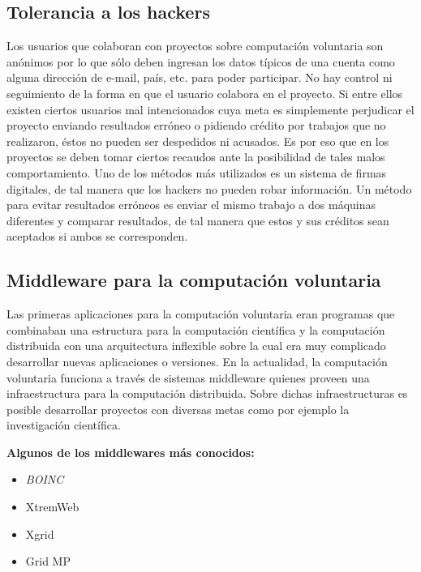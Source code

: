 \subsection{Tolerancia a los hackers}

Los usuarios que colaboran con proyectos sobre computación voluntaria son anónimos por lo que sólo deben ingresan los datos típicos de una cuenta 
como alguna dirección de e-mail, país, etc. para poder participar. No hay control ni seguimiento de la forma en que el usuario colabora en el proyecto. 
Si entre ellos existen ciertos usuarios mal intencionados cuya meta es simplemente perjudicar el proyecto enviando resultados erróneo o pidiendo crédito 
por trabajos que no realizaron, éstos no pueden ser despedidos ni acusados. Es por eso que en los proyectos se deben tomar ciertos recaudos ante la 
posibilidad de tales malos comportamiento.  Uno de los métodos más utilizados es un sistema de firmas digitales, de tal manera que los hackers 
no pueden robar información. Un método para evitar resultados erróneos es enviar el mismo trabajo a dos máquinas diferentes y comparar resultados, 
de tal manera que estos y sus créditos sean aceptados si ambos se corresponden.

\subsection{Middleware para la computación voluntaria}

Las primeras aplicaciones para la computación voluntaria eran programas que combinaban una estructura para la computación científica y la computación
 distribuida con una arquitectura inflexible sobre la cual era muy complicado desarrollar nuevas aplicaciones o versiones.
En la actualidad, la computación voluntaria funciona a través de sistemas middleware quienes proveen una infraestructura para la computación distribuida. 
Sobre dichas infraestructuras es posible desarrollar proyectos con diversas metas como por ejemplo la investigación científica.

\vspace{4mm}

\textbf{Algunos de los middlewares más conocidos:}
\begin{itemize}
 \item \textit{BOINC}
 \item XtremWeb
 \item Xgrid
 \item Grid MP
\end{itemize}

